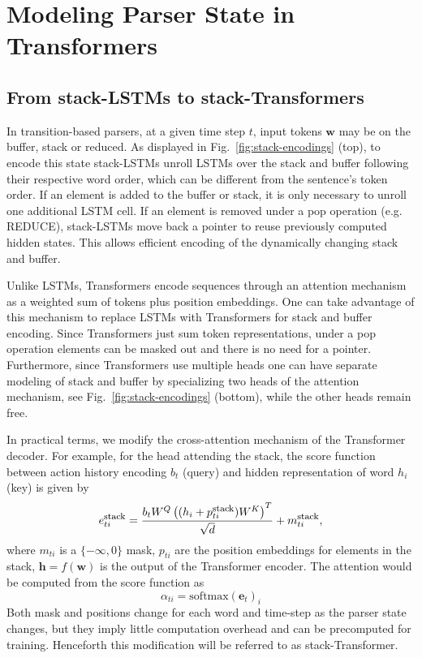 \documentclass[11pt,a4paper]{article}
\begin{document}
\section{Modeling Parser State in Transformers}
\label{section:state}

\subsection{From stack-LSTMs to stack-Transformers}

In transition-based parsers, at a given time step $t$, input tokens $\mathbf{w}$ may be on the buffer, stack or reduced. As displayed in Fig.~\ref{fig:stack-encodings} (top), to encode this state stack-LSTMs unroll LSTMs over the stack and buffer following their respective word order, which can be different from the sentence's token order. If an element is added to the buffer or stack, it is only necessary to unroll one additional LSTM cell. If an element is removed under a pop operation (e.g. \textrm{REDUCE}), stack-LSTMs move back a pointer to reuse previously computed hidden states. This allows efficient encoding of the dynamically changing stack and buffer.

Unlike LSTMs, Transformers \cite{vaswani2017attention} encode sequences through an attention mechanism \cite{bahdanau-etal-2015-neural} as a weighted sum of tokens plus position embeddings. One can take advantage of this mechanism to replace LSTMs with Transformers for stack and buffer encoding. Since Transformers just sum token representations, under a pop operation elements can be masked out and there is no need for a pointer. Furthermore, since Transformers use multiple heads one can have separate modeling of stack and buffer by specializing two heads of the attention mechanism, see Fig.~\ref{fig:stack-encodings} (bottom), while the other heads remain free. 

In practical terms, we modify the cross-attention mechanism of the Transformer decoder. For example, for the head attending the stack, the score function between action history encoding $b_t$ (query) and hidden representation of word $h_i$ (key) is given by \vspace{-.2cm}
\begin{equation}
    e_{ti}^{\mbox{\footnotesize stack}} = \frac{b_t W^Q \left((h_i + p_{ti}^{\mbox{\footnotesize stack}}) W^K \right)^T}{\sqrt{d}} + m_{ti}^{\mbox{\footnotesize stack}}\nonumber,
\end{equation}
where $m_{ti}$ is a $\{-\infty, 0\}$ mask, $p_{ti}$ are the position embeddings for elements in the stack, $\mathbf{h} = f(\mathbf{w})$ is the output of the Transformer encoder. The attention would be computed from the score function as 
\begin{equation}
\alpha_{ti} = \mathrm{softmax}(\mathbf{e}_{t})_i\nonumber
\end{equation}
Both mask and positions change for each word and time-step as the parser state changes, but they imply little computation overhead and can be precomputed for training. Henceforth this modification will be referred to as stack-Transformer.
\end{document}
